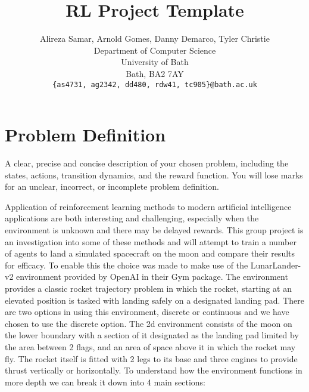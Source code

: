 \documentclass{article}
\title{RL Project Template}
\author{
  Alireza Samar, Arnold Gomes, Danny Demarco, Tyler Christie
  \\
  Department of Computer Science\\
  University of Bath\\
  Bath, BA2 7AY \\
  \texttt{\{as4731, ag2342, dd480, rdw41, tc905\}@bath.ac.uk} \\
}
\begin{document}
\maketitle

\section{Problem Definition}
A clear, precise and concise description of your chosen problem,
including the states, actions, transition dynamics, and the reward function. You will lose
marks for an unclear, incorrect, or incomplete problem definition.

Application of reinforcement learning methods to modern artificial intelligence applications are both interesting and challenging, especially when the environment is unknown and there may be delayed rewards. This group project is an investigation into some of these methods and will attempt to train a number of agents to land a simulated spacecraft on the moon and compare their results for efficacy. To enable this the choice was made to make use of the LunarLander-v2 environment provided by OpenAI in their Gym package. The environment provides a classic rocket trajectory problem in which the rocket, starting at an elevated position is tasked with landing safely on a designated landing pad. There are two options in using this environment, discrete or continuous and we have chosen to use the discrete option. The 2d environment consists of the moon on the lower boundary with a section of it designated as the landing pad limited by the area between 2 flags, and an area of space above it in which the rocket may fly. The rocket itself is fitted with 2 legs to its base and three engines to provide thrust vertically or horizontally. To understand how the environment functions in more depth we can break it down into 4 main sections:
\end{document}
